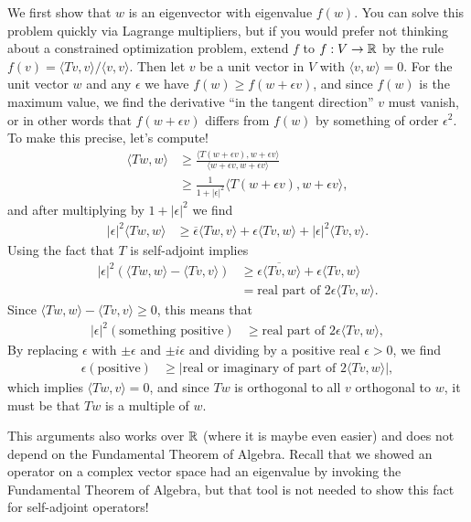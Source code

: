 \documentclass{homework}
\begin{document}
\begin{solution}
  We first show that $w$ is an eigenvector with eigenvalue $f(w)$.
  You can solve this problem quickly via Lagrange multipliers, but if
  you would prefer not thinking about a constrained optimization
  problem, extend $f$ to $f : V \to \mathbb{R}$ by the rule
  $f(v) = \langle Tv, v \rangle / \langle v, v \rangle$.  Then let $v$
  be a unit vector in $V$ with $\langle v, w \rangle = 0$.  For the
  unit vector $w$ and any $\epsilon$ we have
  $f(w) \geq f(w + \epsilon v)$, and since $f(w)$ is the maximum
  value, we find the derivative ``in the tangent direction'' $v$ must
  vanish, or in other words that $f(w + \epsilon v)$ differs from
  $f(w)$ by something of order $\epsilon^2$.  To make this precise,
  let's compute!
  \begin{align*}
    \langle Tw, w \rangle &\geq \frac{\langle T(w + \epsilon v), w + \epsilon v \rangle}{\langle w + \epsilon v, w + \epsilon v \rangle} \\
                          &\geq \frac{1}{1 + |\epsilon|^2} \langle T(w + \epsilon v), w + \epsilon v \rangle,
  \end{align*}
  and after multiplying by $1 + |\epsilon|^2$ we find
  \begin{align*}
   |\epsilon|^2 \langle Tw, w \rangle &\geq \overline{\epsilon} \langle Tw, v \rangle + \epsilon \langle Tv, w \rangle + |\epsilon|^2 \langle Tv, v \rangle.
  \end{align*}
  Using the fact that $T$ is self-adjoint implies
  \begin{align*}
    |\epsilon|^2 \left( \langle Tw, w \rangle - \langle Tv, v \rangle \right) &\geq \overline{\epsilon \langle Tv, w \rangle} + \epsilon \langle Tv, w \rangle \\
    &= \mbox{real part of } 2 \epsilon \langle Tv, w \rangle.
  \end{align*}
  Since $\langle Tw, w \rangle - \langle Tv, v \rangle \geq 0$, this means that 
  \begin{align*}
    |\epsilon|^2 \left( \mbox{something positive} \right) &\geq \mbox{real part of } 2 \epsilon \langle Tv, w \rangle,
  \end{align*}
  By replacing $\epsilon$ with $\pm \epsilon$ and $\pm i \epsilon$ and dividing by a positive real $\epsilon > 0$, we find
  \begin{align*}
    \epsilon \left( \mbox{positive} \right) &\geq \left| \mbox{real or imaginary of part of } 2 \langle Tv, w \rangle \right|,
  \end{align*}
  which implies $\langle Tw, v \rangle = 0$, and since $Tw$ is
  orthogonal to all $v$ orthogonal to $w$, it must be that $Tw$ is a
  multiple of $w$.
  
  This arguments also works over $\mathbb{R}$ (where it is maybe even easier)
  and does not depend on the Fundamental Theorem of Algebra.  Recall
  that we showed an operator on a complex vector space had an
  eigenvalue by invoking the Fundamental Theorem of Algebra, but that
  tool is not needed to show this fact for self-adjoint operators!
\end{solution}
\end{document}
